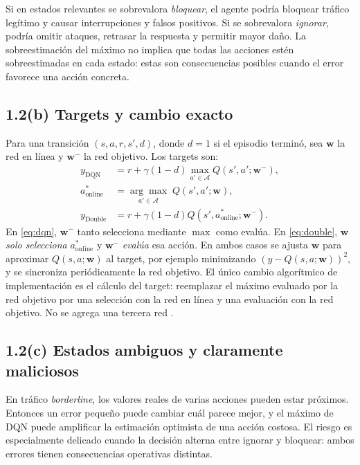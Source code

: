 \documentclass[11pt,a4paper]{article}
\begin{document}
Si en estados relevantes se sobrevalora \emph{bloquear}, el agente podría bloquear tráfico legítimo y causar interrupciones y falsos positivos. Si se sobrevalora \emph{ignorar}, podría omitir ataques, retrasar la respuesta y permitir mayor daño. La sobreestimación del máximo no implica que todas las acciones estén sobreestimadas en cada estado: estas son consecuencias posibles cuando el error favorece una acción concreta.

\subsection*{1.2(b) Targets y cambio exacto}
Para una transición $(s,a,r,s',d)$, donde $d=1$ si el episodio terminó, sea $\mathbf{w}$ la red en línea y $\mathbf{w}^{-}$ la red objetivo. Los targets son:
\begin{align}
 y_{\mathrm{DQN}}&=r+\gamma(1-d)\max_{a'\in\mathcal A}Q(s',a';\mathbf{w}^{-}), \label{eq:dqn}\\
 a^*_{\mathrm{online}}&=\underset{a'\in\mathcal A}{\arg\max}\;Q(s',a';\mathbf{w}),\nonumber\\
 y_{\mathrm{Double}}&=r+\gamma(1-d)Q(s',a^*_{\mathrm{online}};\mathbf{w}^{-}). \label{eq:double}
\end{align}
En \eqref{eq:dqn}, $\mathbf{w}^{-}$ tanto selecciona mediante $\max$ como evalúa. En \eqref{eq:double}, $\mathbf{w}$ \emph{solo selecciona} $a^*_{\mathrm{online}}$ y $\mathbf{w}^{-}$ \emph{evalúa} esa acción. En ambos casos se ajusta $\mathbf{w}$ para aproximar $Q(s,a;\mathbf{w})$ al target, por ejemplo minimizando $(y-Q(s,a;\mathbf{w}))^2$, y se sincroniza periódicamente la red objetivo. El único cambio algorítmico de implementación es el cálculo del target: reemplazar el máximo evaluado por la red objetivo por una selección con la red en línea y una evaluación con la red objetivo. No se agrega una tercera red \cite{diapositivas}.

\subsection*{1.2(c) Estados ambiguos y claramente maliciosos}
En tráfico \emph{borderline}, los valores reales de varias acciones pueden estar próximos. Entonces un error pequeño puede cambiar cuál parece mejor, y el máximo de DQN puede amplificar la estimación optimista de una acción costosa. El riesgo es especialmente delicado cuando la decisión alterna entre ignorar y bloquear: ambos errores tienen consecuencias operativas distintas.
\end{document}
